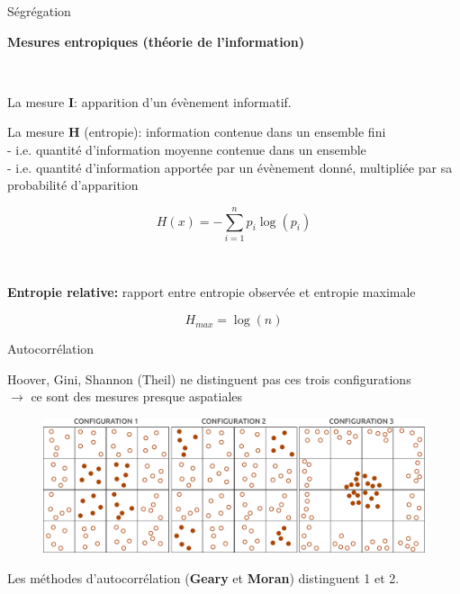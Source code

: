 \begin{frame}{Ségrégation}

\textbf{Mesures entropiques (théorie de l'information)}

~ 

La mesure \textbf{I}: apparition d'un évènement informatif. 

La mesure \textbf{H} (entropie): information contenue dans un ensemble fini \\ 
- i.e. quantité d'information moyenne contenue dans un ensemble \\ 
- i.e. quantité d'information apportée par un évènement donné, multipliée par sa probabilité d'apparition

\begin{equation}
  H(x) = - \sum\limits_{i=1}^n p_i \log(p_i)
  \nonumber
\end{equation}

~

\textbf{Entropie relative:} rapport entre entropie observée et entropie maximale

\begin{equation}
  H_{max} = \log(n)
  \nonumber
\end{equation}

\end{frame}


\begin{frame}{Autocorrélation}

Hoover, Gini, Shannon (Theil) ne distinguent pas ces trois configurations \\
$\rightarrow$ ce sont des mesures presque aspatiales

\begin{figure}
\includegraphics[width=12cm]{NonSpatial.pdf}
\end{figure}

Les méthodes d'autocorrélation (\textbf{Geary} et \textbf{Moran}) distinguent 1 et 2.

\end{frame}


